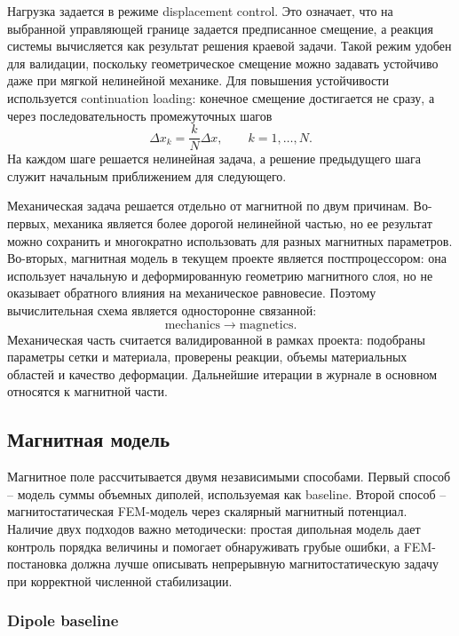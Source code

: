 \documentclass[12pt,a4paper]{article}
\begin{document}
Нагрузка задается в режиме displacement control. Это означает, что на выбранной
управляющей границе задается предписанное смещение, а реакция системы
вычисляется как результат решения краевой задачи. Такой режим удобен для
валидации, поскольку геометрическое смещение можно задавать устойчиво даже при
мягкой нелинейной механике. Для повышения устойчивости используется continuation
loading: конечное смещение достигается не сразу, а через последовательность
промежуточных шагов
\[
    \Delta x_k = \frac{k}{N}\Delta x,\qquad k=1,\ldots,N.
\]
На каждом шаге решается нелинейная задача, а решение предыдущего шага служит
начальным приближением для следующего.

Механическая задача решается отдельно от магнитной по двум причинам. Во-первых,
механика является более дорогой нелинейной частью, но ее результат можно
сохранить и многократно использовать для разных магнитных параметров. Во-вторых,
магнитная модель в текущем проекте является постпроцессором: она использует
начальную и деформированную геометрию магнитного слоя, но не оказывает обратного
влияния на механическое равновесие. Поэтому вычислительная схема является
односторонне связанной:
\[
    \text{mechanics} \longrightarrow \text{magnetics}.
\]
Механическая часть считается валидированной в рамках проекта: подобраны
параметры сетки и материала, проверены реакции, объемы материальных областей и
качество деформации. Дальнейшие итерации в журнале в основном относятся к
магнитной части.

\subsection{Магнитная модель}

Магнитное поле рассчитывается двумя независимыми способами. Первый способ --
модель суммы объемных диполей, используемая как baseline. Второй способ --
магнитостатическая FEM-модель через скалярный магнитный потенциал. Наличие двух
подходов важно методически: простая дипольная модель дает контроль порядка
величины и помогает обнаруживать грубые ошибки, а FEM-постановка должна лучше
описывать непрерывную магнитостатическую задачу при корректной численной
стабилизации.

\subsubsection{Dipole baseline}
\end{document}
